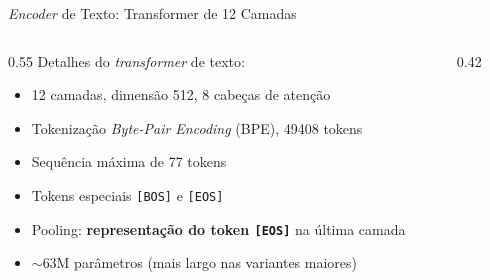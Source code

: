 \documentclass[aspectratio=169,xcolor=dvipsnames]{beamer}
\begin{document}
  \begin{frame}{\textit{Encoder} de Texto: Transformer de 12 Camadas}
    \begin{columns}[T]
      \begin{column}{0.55\textwidth}
        Detalhes do \textit{transformer} de texto:
        \begin{itemize}
          \item 12 camadas, dimensão 512, 8 cabeças de atenção
          \item Tokenização \textit{Byte-Pair Encoding} (BPE), 49408 tokens
          \item Sequência máxima de 77 tokens
          \item Tokens especiais \texttt{[BOS]} e \texttt{[EOS]}
          \item Pooling: \textbf{representação do token \texttt{[EOS]}} na última camada
          \item $\sim$63M parâmetros (mais largo nas variantes maiores)
        \end{itemize}
      \end{column}
      \begin{column}{0.42\textwidth}
        \centering
      \end{column}
    \end{columns}
  \end{frame}
\end{document}
